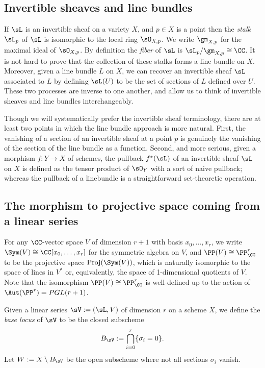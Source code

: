 \subsection{Invertible sheaves and line bundles}

If $\sL$ is an invertible sheaf on a variety $X$, and $p\in X$ is a point then the \emph{stalk} $\sL_p$ of $\sL$ is isomorphic to the local
ring $\sO_{X,p}$. We write $\gm_{X,p}$ for the maximal ideal of $\sO_{X,p}$. By definition the \emph{fiber} of $\sL$ is 
$\sL_p/\gm_{X,p}\cong \CC$. It is not hard to prove that the collection of these stalks forms a line bundle on $X$. Moreover,
given a line bundle $L$ on $X$, we can recover an invertible sheaf $\sL$ associated to $L$ by defining
$\sL(U)$ to be the set of sections of $L$ defined over $U$. These two processes are inverse to one another, and allow
us to think of invertible sheaves and line bundles interchangeably.

Though we will systematically prefer the invertible sheaf terminology, there are at least two points in which the line bundle approach is more natural. First,  the vanishing of a section of an invertible sheaf at a point $p$ is genuinely the vanishing of the 
section of the line bundle as a function. Second, and more serious, given a morphism $f: Y\to X$ of schemes, the 
pullback $f^*(\sL)$ of an invertible sheaf $\sL$ on $X$ is defined as the tensor product of $\sO_Y$ with a sort of naive pullback; whereas the pullback of a linebundle is a straightforward set-theoretic operation.


\subsection{The morphism to projective space coming from a linear series} \label{morphism from series}
For any $\CC$-vector space $V$ of dimension $r+1$ with basis $x_{0}, \dots, x_{r}$, we write $\Sym(V) \cong \CC[x_{0},\dots, x_{r}]$ for the symmetric algebra on $V$, and
$\PP(V)\cong \PP^{r}_{\CC}$ to be the projective space ${\rm Proj}(\Sym(V))$, which is naturally isomorphic to the
space of lines in $V^{*}$ or, equivalently,  the space of 1-dimensional quotients of $V$. Note that the isomorphism $\PP(V)\cong \PP^{r}_{\CC}$ is well-defined up to the action
of $\Aut(\PP^r) = PGL(r+1)$.


Given a linear series $\sV:=(\sL, V)$  of dimension $r$ on a scheme $X$, 
we define the \emph{base locus} of $\sV$ to be the closed subscheme 
$$
B_\sV := \bigcap_{i= 0}^{r}\{\sigma_{i} = 0\}.
$$
Let $W:=X\setminus B_\sV$ be the open subscheme where not all sections $\sigma_{i}$ vanish.

